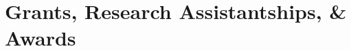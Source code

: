 \documentclass[11pt,a4paper,sans]{moderncv} %
\newcommand\Colorhref[3][orange]{\href{#2}{\small\color{#1}#3}}
\begin{document}






\section{Grants, Research Assistantships, \& Awards}
\end{document}
